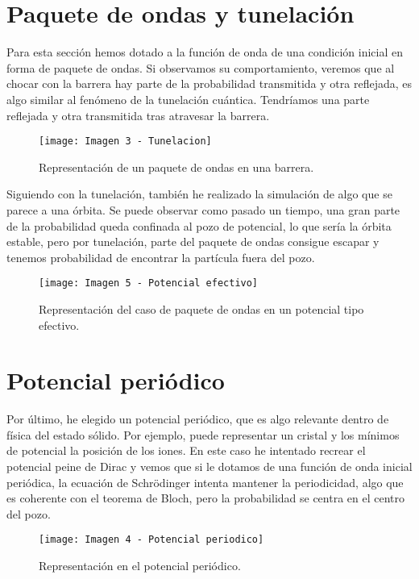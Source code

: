 \documentclass{article} %
\begin{document}
\section{Paquete de ondas y tunelación}

Para esta sección hemos dotado a la función de onda de una condición inicial en forma de paquete de ondas. Si observamos su comportamiento, veremos que al chocar con la barrera hay parte de la probabilidad transmitida y otra reflejada, es algo similar al fenómeno de la tunelación cuántica. Tendríamos una parte reflejada y otra transmitida tras atravesar la barrera.

\begin{figure}[h!]
\begin{center}
\texttt{[image: Imagen 3 - Tunelacion]}
\caption{Representación de un paquete de ondas en una barrera.}
\end{center}
\end{figure}

Siguiendo con la tunelación, también he realizado la simulación de algo que se parece a una órbita. Se puede observar como pasado un tiempo, una gran parte de la probabilidad queda confinada al pozo de potencial, lo que sería la órbita estable, pero por tunelación, parte del paquete de ondas consigue escapar y tenemos probabilidad de  encontrar la partícula fuera del pozo.

\begin{figure}[h!]
\begin{center}
\texttt{[image: Imagen 5 - Potencial efectivo]}
\caption{Representación del caso de paquete de ondas en un potencial tipo efectivo.}
\end{center}
\end{figure}

\section{Potencial periódico}

Por último, he elegido un potencial periódico, que es algo relevante dentro de física del estado sólido. Por ejemplo, puede representar un cristal y los mínimos de potencial la posición de los iones. En este caso he intentado recrear el potencial peine de Dirac y vemos que si le dotamos de una función de onda inicial periódica, la ecuación de Schrödinger intenta mantener la periodicidad, algo que es coherente con el teorema de Bloch, pero la probabilidad se centra en el centro del pozo.

\begin{figure}[h!]
\begin{center}
\texttt{[image: Imagen 4 - Potencial periodico]}
\caption{Representación en el potencial periódico.}
\end{center}
\end{figure}
\end{document}

